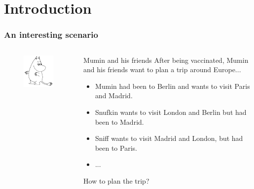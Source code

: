\section{Introduction}

\begin{frame}
\frametitle{An interesting scenario}
\begin{columns}
	\begin{column}{.4\textwidth}
		\begin{figure}
			\centering
			\includegraphics[width=5cm]{Mumin}
		\end{figure}
	\end{column}
	\begin{column}{.5\textwidth}
		\begin{alertblock}{Mumin and his friends}
			After being vaccinated, Mumin and his friends want to
			plan a trip around Europe...
			\begin{itemize}
				\item Mumin had been to Berlin and wants to visit Paris and Madrid.
				\item Snufkin wants to visit London and Berlin but had been to Madrid.
				\item Sniff wants to visit Madrid and London, but had been to Paris.
				\item ...
			\end{itemize}
			How to plan the trip?
		\end{alertblock}
	\end{column}
\end{columns}
\end{frame}

